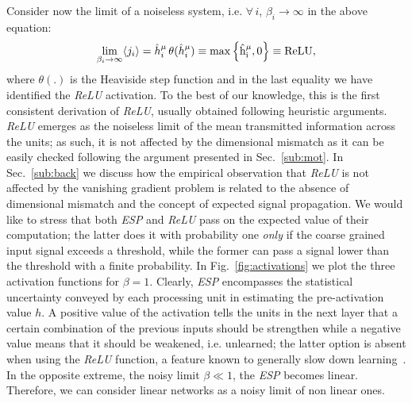 \documentclass[5p]{elsarticle}
\begin{document}
Consider now the limit of a noiseless system, i.e. $\forall \, i$, $\beta_i \to \infty $ in the above equation:
%
\begin{equation} \label{eq:ps6}
\lim_{\beta_i \to \infty } \langle j_i \rangle =  \hat{h}^{\mu}_i \, \theta(\hat{h}^{\mu}_i)  \equiv   \rm{max} \left\{ \hat{h}^{\mu}_i, 0\right\} \equiv ReLU,
\end{equation}
%
where $\theta(.)$ is the Heaviside step function and in the last equality we have identified the {\it ReLU} activation. To the best of our knowledge, this is the first consistent derivation of {\it ReLU}, usually obtained following heuristic arguments. {\it ReLU} emerges as the noiseless limit of the mean transmitted information across the units; as such, it is not affected by the dimensional mismatch as it can be easily checked following the argument presented in Sec.~\eqref{sub:mot}. In Sec.~\eqref{sub:back} we discuss how the empirical observation that  {\it ReLU}  is not affected by the vanishing gradient problem is related to the absence of dimensional mismatch and the concept of expected signal propagation. We would like to stress that both {\it ESP} and {\it ReLU} pass on the expected value of their computation; the latter does it with probability one {\it only} if the coarse grained input signal exceeds a threshold, while the former can pass a signal lower than the threshold with a finite probability. In Fig.~\eqref{fig:activations} we plot the three activation functions for $\beta=1$. Clearly, {\it ESP} encompasses the statistical uncertainty conveyed by each processing unit in estimating the pre-activation value $h$. A positive value of the activation tells the units in the next layer that a certain combination of the previous inputs should be strengthen while a negative value means that it should be weakened, i.e. unlearned; the latter option is absent when using the {\it ReLU} function, a feature known to generally slow down learning~\cite{engel}. In the opposite extreme, the noisy limit $\beta \ll 1$, the {\it ESP} becomes linear. Therefore, we can consider linear networks as a noisy limit of non linear ones.
%
\end{document}
